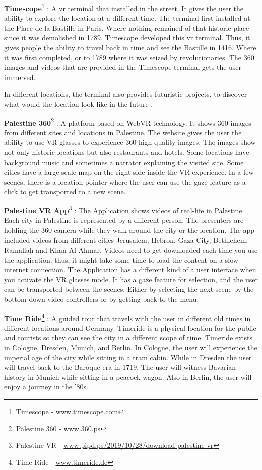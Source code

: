 \textbf{Timescope}\footnote{Timescope - \url{www.timescope.com}} : A \acrshort{vr} terminal that installed in the street. It gives the user the ability to explore the location at a different time. The terminal first installed at the Place de la Bastille in Paris. Where nothing remained of that historic place since it was demolished in 1789. Timescope developed this \acrshort{vr} terminal. Thus, it gives people the ability to travel back in time and see the Bastille in 1416. Where it was first completed, or to 1789 where it was seized by revolutionaries. The 360 images and videos that are provided in the Timescope terminal gets the user immersed.

In different locations, the terminal also provides futuristic projects, to discover what would the location look like in the future \citep{Hiner2016HowTechRepublic}. 

\textbf{Palestine 360}\footnote{Palestine 360 - \url{www.360.ps}} : A platform based on WebVR technology. It shows 360 images from different sites and locations in Palestine. The website gives the user the ability to use VR glasses to experience 360 high-quality images. The images show not only historic locations but also restaurants and hotels. Some locations have background music and sometimes a narrator explaining the visited site. Some cities have a large-scale map on the right-side inside the VR experience. In a few scenes, there is a location-pointer where the user can use the gaze feature as a click to get transported to a new scene. 


\textbf{Palestine VR App}\footnote{Palestine VR - \url{www.pipd.ps/2019/10/28/download-palestine-vr}} : The Application shows videos of real-life in Palestine. Each city in Palestine is represented by a different person. The presenters are holding the 360 camera while they walk around the city or the location. The app included videos from different cities Jerusalem, Hebron, Gaza City, Bethlehem, Ramallah and Khan Al Ahmar. Videos need to get downloaded each time you use the application. thus, it might take some time to load the content on a slow internet connection. The Application has a different kind of a user interface when you activate the VR glasses mode. It has a gaze feature for selection, and the user can be transported between the scenes. Either by selecting the next scene by the bottom down video controllers or by getting back to the menu. 

\textbf{Time Ride}\footnote{Time Ride - \url{www.timeride.de}} : A guided tour that travels with the user in different old times in different locations around Germany. Timeride is a physical location for the public and tourists so they can see the city in a different scope of time. Timeride exists in Cologne, Dresden, Munich, and Berlin. In Cologne, the user will experience the imperial age of the city while sitting in a tram cabin. While in Dresden the user will travel back to the Baroque era in 1719. The user will witness Bavarian history in Munich while sitting in a peacock wagon. Also in Berlin, the user will enjoy a journey in the '80s.


